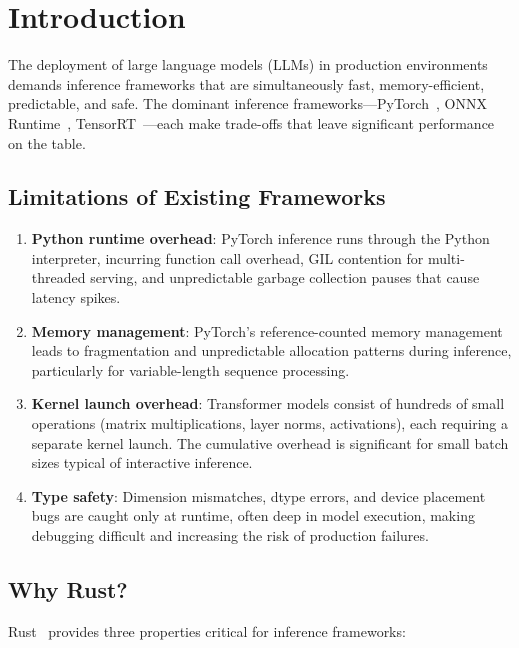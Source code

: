 \section{Introduction}

\label{sec:intro}

The deployment of large language models (LLMs) in production environments demands inference frameworks that are simultaneously fast, memory-efficient, predictable, and safe. The dominant inference frameworks---PyTorch~\cite{paszke2019pytorch}, ONNX Runtime~\cite{onnxruntime2019}, TensorRT~\cite{tensorrt2017}---each make trade-offs that leave significant performance on the table.

\subsection{Limitations of Existing Frameworks}

\begin{enumerate}[leftmargin=1.4em]
    \item \textbf{Python runtime overhead}: PyTorch inference runs through the Python interpreter, incurring function call overhead, GIL contention for multi-threaded serving, and unpredictable garbage collection pauses that cause latency spikes.
    \item \textbf{Memory management}: PyTorch's reference-counted memory management leads to fragmentation and unpredictable allocation patterns during inference, particularly for variable-length sequence processing.
    \item \textbf{Kernel launch overhead}: Transformer models consist of hundreds of small operations (matrix multiplications, layer norms, activations), each requiring a separate kernel launch. The cumulative overhead is significant for small batch sizes typical of interactive inference.
    \item \textbf{Type safety}: Dimension mismatches, dtype errors, and device placement bugs are caught only at runtime, often deep in model execution, making debugging difficult and increasing the risk of production failures.
\end{enumerate}

\subsection{Why Rust?}

Rust~\cite{klabnik2019rust} provides three properties critical for inference frameworks:


